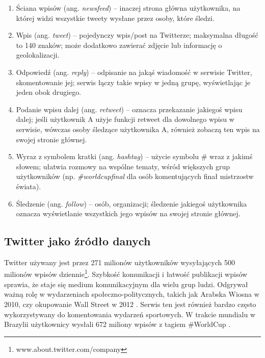 \begin{enumerate}
  \item Ściana wpisów (ang. \textit{newsfeed}) -- inaczej strona główna 
  użytkownika, na której widzi wszystkie tweety wysłane przez osoby, które śledzi.
  
  \item Wpis (ang. \textit{tweet}) -- pojedynczy wpis/post na Twitterze; 
  maksymalna długość to 140 znaków; może dodatkowo zawierać zdjęcie lub 
  informację o geolokalizacji.

  \item Odpowiedź (ang. \textit{reply}) -- odpisanie na jakąś wiadomość w serwisie
  Twitter, skomentowanie jej; serwis łączy takie wpisy w jedną grupę, wyświetlając
  je jeden obok drugiego.
  
  \item Podanie wpisu dalej (ang. \textit{retweet}) -- oznacza przekazanie 
  jakiegoś wpisu dalej; jeśli użytkownik A użyje funkcji
  retweet dla dowolnego wpisu w serwisie, wówczas osoby śledzące użytkownika A, 
  również zobaczą ten wpis na swojej stronie głównej.
  
  \item Wyraz z symbolem kratki (ang. \textit{hashtag}) -- użycie symbolu \# 
  wraz z jakimś słowem; ułatwia rozmowy na wspólne tematy, wśród większych grup
  użytkowników (np. \textit{\#worldcupfinal} dla osób komentujących finał 
  mistrzostw świata).

  \item Śledzenie (ang. \textit{follow}) -- osób, organizacji; śledzenie 
  jakiegoś użytkownika oznacza wyświetlanie wszystkich jego wpisów na swojej 
  stronie głównej.
\end{enumerate} 

\subsection{Twitter jako źródło danych}
Twitter używany jest przez 271 milionów użytkowników wysyłających 500 
milionów wpisów dziennie\footnote{www.about.twitter.com/company}.
Szybkość komunikacji i łatwość publikacji wpisów
sprawia, że staje się medium komunikacyjnym dla wielu grup ludzi.
Odgrywał ważną rolę w wydarzeniach społeczno-politycznych,
takich jak Arabska Wiosna w 2010, czy okupowanie Wall Street w 2012 
\cite{TwitterDataAnalytics2013}.
Serwis ten jest również bardzo często wykorzystywany do komentowania wydarzeń
sportowych. W trakcie mundialu w Brazylii użytkownicy wysłali 672 miliony
wpisów z tagiem \#WorldCup \cite{TwitterStatsWorldCup}.


